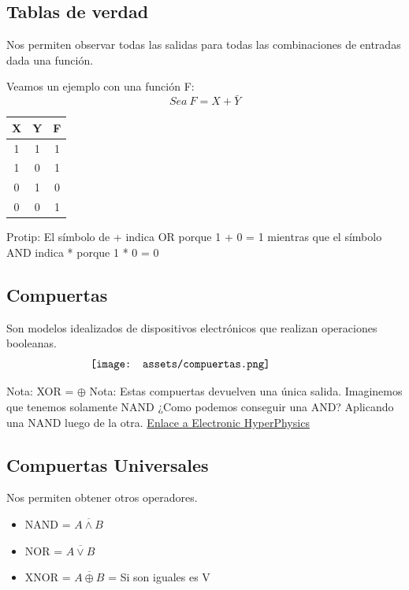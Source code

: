 \documentclass[10pt,a4paper]{article}
\begin{document}
\subsection*{Tablas de verdad} \label{subsec:TDV}
Nos permiten observar todas las salidas para todas las combinaciones de entradas dada una función. 

Veamos un ejemplo con una función F: 
\[Sea \ F = X + \bar{Y}\]
\begin{table}[h!]
    \centering
    \begin{tabular}{|c | c | c|}
    \hline
    \textbf{X} & \textbf{Y} & \textbf{F}  \\[0.1cm]
    \hline\hline
    1 & 1 & 1 \\
    1 & 0 & 1 \\
    0 & 1 & 0 \\
    0 & 0 & 1 \\
    \hline
    \end{tabular}
    \label{tab:x_y}
\end{table}

Protip: El símbolo de + indica OR porque 1 + 0 = 1 mientras que el símbolo AND indica * porque 1 * 0 = 0 

\subsection*{Compuertas}
Son modelos idealizados de dispositivos electrónicos que realizan operaciones booleanas.\\
\[\begin{minipage}[b]{0.6\textwidth}
    \texttt{[image: assets/compuertas.png]}
    \label{fig:compuertas}
\end{minipage}\]

Nota: XOR = \(\oplus\) 
Nota: Estas compuertas devuelven una única salida. Imaginemos que tenemos solamente NAND ¿Como podemos conseguir una AND? Aplicando una NAND luego de la otra.  \href{http://hyperphysics.phy-astr.gsu.edu/hbasees/Electronic/nand.html}{Enlace a Electronic HyperPhysics}
\subsection*{Compuertas Universales}
Nos permiten obtener otros operadores.
\begin{itemize}
    \item NAND = \(\overline{A \land B}\)
    \item NOR = \(\overline{A \lor B}\)
    \item XNOR = \(\overline{A \oplus B}\) = Si son iguales es V
\end{itemize} 
\end{document}
